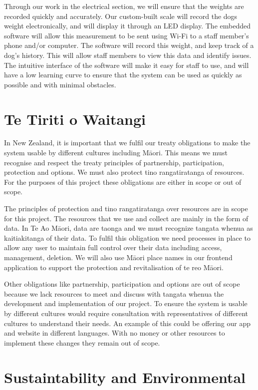 Through our work in the electrical section, we will ensure that the weights are recorded quickly and accurately. Our custom-built scale will record the dogs weight electronically, and will display it through an LED display. The embedded software will allow this measurement to be sent using Wi-Fi to a staff member’s phone and/or computer. The software will record this weight, and keep track of a dog’s history. This will allow staff members to view this data and identify issues. The intuitive interface of the software will make it easy for staff to use, and will have a low learning curve to ensure that the system can be used as quickly as possible and with minimal obstacles. 


\section{Te Tiriti o Waitangi}

In New Zealand, it is important that we fulfil our treaty obligations to make the system usable by different cultures including Māori. This means we must recognise and respect the treaty principles of partnership, participation, protection and options. We must also protect tino rangatiratanga of resources. For the purposes of this project these obligations are either in scope or out of scope. 

The principles of protection and tino rangatiratanga over resources are in scope for this project. The resources that we use and collect are mainly in the form of data. In Te Ao Māori, data are taonga and we must recognize tangata whenua as kaitiakitanga of their data. To fulfil this obligation we need processes in place to allow any user to maintain full control over their data including access, management, deletion. We will also use Māori place names in our frontend application to support the protection and revitalisation of  te reo Māori.   

Other obligations like partnership, participation and options are out of scope because we lack resources to meet and discuss with tangata whenua the development and implementation of our project. To ensure the system is usable by different cultures would require consultation with representatives of different cultures to understand their needs. An example of this could be offering our app and website in different languages. With no money or other resources to implement these changes they remain out of scope. 


\section{Sustaintability and Environmental}

